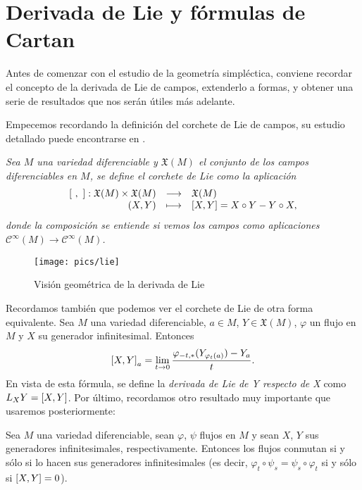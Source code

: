 \section{Derivada de Lie y fórmulas de Cartan}\label{sec:lie}

Antes de comenzar con el estudio de la geometría simpléctica, conviene recordar el concepto de la derivada de Lie de campos, extenderlo a formas, y obtener una serie de resultados que nos serán útiles más adelante.

Empecemos recordando la definición del corchete de Lie de campos, su estudio detallado puede encontrarse en \cite{variedades}.

\begin{defn}
  \em
  Sea $M$ una variedad diferenciable y $\mathfrak{X}(M)$ el conjunto de los campos diferenciables en $M$, se define el \emph{corchete de Lie} como la aplicación
  \begin{equation*}
    \begin{array}{rcl}
    \left[\ ,\ \right]: \mathfrak{X}(M) \times \mathfrak{X}(M) & \longrightarrow & \mathfrak{X}(M) \\
    (X,Y) & \longmapsto & \left[X,Y\right] = X \circ Y - Y \circ X,
  \end{array}
  \end{equation*}
  donde la composición se entiende si vemos los campos como aplicaciones $\mathscr{C}^{\infty}(M) \rightarrow \mathscr{C}^{\infty}(M)$.
\end{defn}
\begin{figure}[h]
  \centering
  \texttt{[image: pics/lie]}
  \caption{\small Visión geométrica de la derivada de Lie}
  \label{fig:lie}
\end{figure}
Recordamos también que podemos ver el corchete de Lie de otra forma equivalente. Sea $M$ una variedad diferenciable, $a \in M$, $Y \in \mathfrak{X}(M)$, $\varphi$ un flujo en $M$ y $X$ su generador infinitesimal. Entonces
\begin{equation*}
  \left[X,Y\right]_a= \lim_{t\rightarrow 0}\frac{\varphi_{-t,*}(Y_{\varphi_t(a)})-Y_a}{t}.
\end{equation*}
En vista de esta fórmula, se define la \emph{derivada de Lie de Y respecto de X} como $L_XY=\left[X,Y\right]$. 
Por último, recordamos otro resultado muy importante que usaremos posteriormente:
\begin{prop}
  Sea $M$ una variedad diferenciable, sean $\varphi$, $\psi$ flujos en $M$ y sean $X$, $Y$ sus generadores infinitesimales, respectivamente. Entonces los flujos conmutan si y sólo si lo hacen sus generadores infinitesimales (es decir, $\varphi_t \circ \psi_s = \psi_s \circ \varphi_t$ si y sólo si $\left[X,Y\right]=0$).
\end{prop} 

